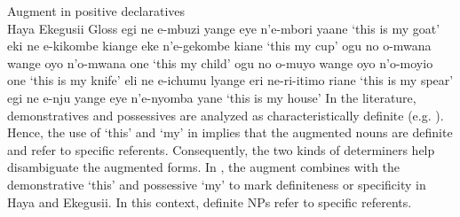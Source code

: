 \documentclass[output=paper]{langscibook}
\begin{document}
\ea Augment in positive declaratives\smallskip\\
\label{hayagusii26}
             \hphantom{abc }Haya				\hphantom{t e-kikombe kiange}\hspace{1ex}Ekegusii			\hphantom{ekombe kiane}Gloss
  \ea\label{hayagusii26a}	egi ne e-mbuzi yange\hphantom{tae}\hspace{1ex} 		eye n’e-mbori	yaane\hphantom{ne}		‘this is my goat’
  \ex\label{hayagusii26b}	eki ne e-kikombe kiange\hspace{1ex}	 eke n’e-gekombe kiane	 ‘this my cup’
  \ex\label{hayagusii26c}	ogu no o-mwana wange\hphantom{i}\hspace{1ex} 	oyo n’o-mwana one\hphantom{ine}		‘this my child’
  \ex\label{hayagusii26d}	ogu no o-muyo wange\hphantom{ge}\hspace{1ex}   	oyo n’o-moyio one\hphantom{ame}		‘this is my knife’
  \ex\label{hayagusii26e}	eli ne e-ichumu lyange\hphantom{te}\hspace{1ex} 	eri ne-ri-itimo riane\hphantom{ine}		‘this is my spear’
  \ex\label{hayagusii26f}	egi ne e-nju yange\hphantom{iiange}\hspace{1ex}		eye n’e-nyomba yane\hphantom{m}	 	‘this is my house’
  \z
\z
In the literature, demonstratives and possessives are analyzed as characteristically definite (e.g. \citealt[§3]{lyons1999definiteness}). Hence, the use of ‘this’ and ‘my’ in  implies that the augmented nouns are definite and refer to specific referents. Consequently, the two kinds of determiners help disambiguate the augmented forms. In , the augment combines with the demonstrative ‘this’ and possessive ‘my’ to mark definiteness or specificity in Haya and Ekegusii. In this context, definite NPs refer to specific referents.
\end{document}
